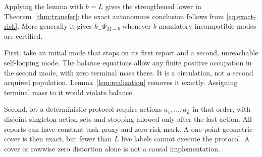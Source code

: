 Applying the lemma with $b=L$ gives the strengthened lower in Theorem~\ref{thm:transfer}; the exact autonomous conclusion follows from \eqref{eq:exact-risk}. More generally it gives $k_-\Psi_{M-b}$ whenever $b$ mandatory incompatible modes are certified.

\begin{example}\label{ex:circulation}
First, take an initial mode that stops on its first report and a second, unreachable self-looping mode. The balance equations allow any finite positive occupation in the second mode, with zero terminal mass there. It is a circulation, not a second acquired population. Lemma~\ref{lem:realization} removes it exactly. Assigning terminal mass to it would violate balance.

Second, let a deterministic protocol require actions $a_1,\ldots,a_L$ in that order, with disjoint singleton action sets and stopping allowed only after the last action. All reports can have constant task proxy and zero risk mark. A one-point geometric cover is then exact, but fewer than $L$ live labels cannot execute the protocol. A cover or rowwise zero distortion alone is not a causal implementation.
\end{example}
